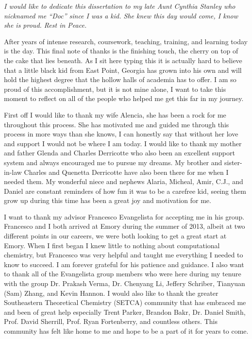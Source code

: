 \documentclass[final]{emory}
\begin{document}
\begin{acknowledgement}%
\begin{center}
\textit{I would like to dedicate this dissertation to my late Aunt Cynthia Stanley who nicknamed me ``Doc'' since I was a kid. She knew this day would come, I know she is proud. Rest in Peace.}
\end{center}

After years of intense research, coursework, teaching, training, and learning today is the day. This final note of thanks is the finishing touch, the cherry on top of the cake that lies beneath. As I sit here typing this it is actually hard to believe that a little black kid from East Point, Georgia has grown into his own and will hold the highest degree that the hollow halls of academia has to offer. I am so proud of this accomplishment, but it is not mine alone, I want to take this moment to reflect on all of the people who helped me get this far in my journey.

First off I would like to thank my wife Alencia, she has been a rock for me throughout this process. She has motivated me and guided me through this process in more ways than she knows, I can honestly say that without her love and support I would not be where I am today. I would like to thank my mother and father Glenda and Charles Derricotte who also been an excellent support system and always encouraged me to pursue my dreams. My brother and sister-in-law Charles and Quenetta Derricotte have also been there for me when I needed them. My wonderful niece and nephews Alaria, Micheal, Amir, C.J., and Daniel are constant reminders of how fun it was to be a carefree kid, seeing them grow up during this time has been a great joy and motivation for me.

I want to thank my advisor Francesco Evangelista for accepting me in his group. Francesco and I both arrived at Emory during the summer of 2013, albeit at two different points in our careers, we were both looking to get a great start at Emory. When I first began I knew little to nothing about computational chemistry, but Francesco was very helpful and taught me everything I needed to know to succeed. I am forever grateful for his patience and guidance. I also want to thank all of the Evangelista group members who were here during my tenure with the group Dr. Prakash Verma, Dr. Chenyang Li, Jeffery Schriber, Tianyuan (Sam) Zhang, and Kevin Hannon. I would also like to thank the greater Southeastern Theoretical Chemistry (SETCA) community that has embraced me and been of great help especially Trent Parker, Brandon Bakr, Dr. Daniel Smith, Prof. David Sherrill, Prof. Ryan Fortenberry, and countless others. This community has felt like home to me and hope to be a part of it for years to come.
\end{acknowledgement}
\end{document}
